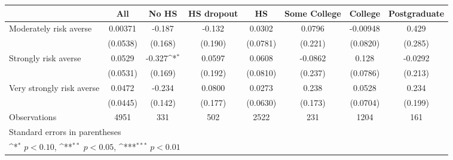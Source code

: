 {
\def\sym#1{\ifmmode^{#1}\else\(^{#1}\)\fi}
\begin{tabular}{l*{7}{c}}
\toprule
                    &\multicolumn{1}{c}{All}&\multicolumn{1}{c}{No HS}&\multicolumn{1}{c}{HS dropout}&\multicolumn{1}{c}{HS}&\multicolumn{1}{c}{Some College}&\multicolumn{1}{c}{College}&\multicolumn{1}{c}{Postgraduate}\\
\midrule
Moderately risk averse&     0.00371         &      -0.187         &      -0.132         &      0.0302         &      0.0796         &    -0.00948         &       0.429         \\
                    &    (0.0538)         &     (0.168)         &     (0.190)         &    (0.0781)         &     (0.221)         &    (0.0820)         &     (0.285)         \\
\addlinespace
Strongly risk averse&      0.0529         &      -0.327\sym{*}  &      0.0597         &      0.0608         &     -0.0862         &       0.128         &     -0.0292         \\
                    &    (0.0531)         &     (0.169)         &     (0.192)         &    (0.0810)         &     (0.237)         &    (0.0786)         &     (0.213)         \\
\addlinespace
Very strongly risk averse&      0.0472         &      -0.234         &      0.0800         &      0.0273         &       0.238         &      0.0528         &       0.234         \\
                    &    (0.0445)         &     (0.142)         &     (0.177)         &    (0.0630)         &     (0.173)         &    (0.0704)         &     (0.199)         \\
\midrule
Observations        &        4951         &         331         &         502         &        2522         &         231         &        1204         &         161         \\
\bottomrule
\multicolumn{8}{l}{\footnotesize Standard errors in parentheses}\\
\multicolumn{8}{l}{\footnotesize \sym{*} \(p<0.10\), \sym{**} \(p<0.05\), \sym{***} \(p<0.01\)}\\
\end{tabular}
}
